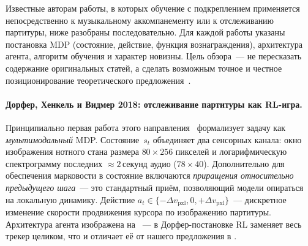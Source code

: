 %
Известные авторам работы, в которых обучение с подкреплением
применяется непосредственно к музыкальному аккомпанементу или к
отслеживанию партитуры, ниже разобраны последовательно. Для
каждой работы указаны постановка MDP (состояние, действие,
функция вознаграждения), архитектура агента, алгоритм обучения и
характер новизны. Цель обзора~--- не пересказать содержание
оригинальных статей, а сделать возможным точное и честное
позиционирование теоретического предложения~.

\paragraph*{Дорфер, Хенкель и Видмер 2018: отслеживание
партитуры как RL-игра.} Принципиально первая работа этого
направления~\cite{Dorfer2018RL} формализует задачу как
\textit{мультимодальный} MDP. Состояние~$s_t$ объединяет два
сенсорных канала: окно изображения нотного стана размера
$80\times256$ пикселей и логарифмическую спектрограмму последних
$\approx 2$\,секунд аудио ($78\times 40$). Дополнительно для
обеспечения марковости в состояние включаются \textit{приращения
относительно предыдущего шага}~--- это стандартный приём,
позволяющий модели опираться на локальную динамику. Действие
$a_t\in\{-\Delta v_{\text{pxl}}, 0, +\Delta v_{\text{pxl}}\}$~---
дискретное изменение скорости продвижения курсора по
изображению партитуры. Архитектура агента изображена на
~--- в Дорфер-постановке RL заменяет весь
трекер целиком, что и отличает её от нашего предложения в
.

